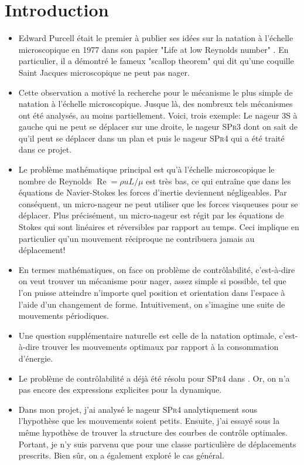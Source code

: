 \documentclass[12pt,a4paper]{article}
\theoremstyle{plain}
\theoremstyle{plain}
\theoremstyle{plain}
\theoremstyle{definition}
\theoremstyle{definition}
\theoremstyle{definition}
\theoremstyle{plain}
\DeclareMathOperator{\re}{Re}
\begin{document}
\section{Introduction}
\begin{itemize}
\item Edward Purcell était le premier à publier ses idées sur la natation à l'échelle microscopique en 1977 dans son papier "Life at low Reynolds number" \cite{Purcell1977}. En particulier, il a démontré le fameux "scallop theorem" qui dit qu'une coquille Saint Jacques microscopique ne peut pas nager.

\item Cette observation a motivé la recherche pour le mécanisme le plus simple de natation à l'échelle microscopique. Jusque là, des nombreux tels mécanismes ont été analysés, au moins partiellement. Voici, trois exemple: Le nageur \textsc{3S} à gauche qui ne peut se déplacer sur une droite, le nageur \textsc{SPr3} dont on sait de \cite{Alouges2017} qu'il peut se déplacer dans un plan et puis le nageur \textsc{SPr4} qui a été traité dans ce projet.

\item Le problème mathématique principal est qu'à l'échelle microscopique le nombre de Reynolds $\re = \rho u L/\mu$ est très bas, ce qui entraîne que dans les équations de Navier-Stokes les forces d'inertie deviennent négligeables. Par conséquent, un micro-nageur ne peut utiliser que les forces visqueuses pour se déplacer. Plus précisément, un micro-nageur est régit par les équations de Stokes qui sont linéaires et réversibles par rapport au temps. Ceci implique en particulier qu'un mouvement réciproque ne contribuera jamais au déplacement!

\item En termes mathématiques, on face on problème de contrôlabilité, c'est-à-dire on veut trouver un mécanisme pour nager, assez simple si possible, tel que l'on puisse atteindre n'importe quel position et orientation dans l'espace à l'aide d'un changement de forme. Intuitivement, on s'imagine une suite de mouvements périodiques.

\item Une question supplémentaire naturelle est celle de la natation optimale, c'est-à-dire trouver les mouvements optimaux par rapport à la consommation d'énergie.

\item Le problème de contrôlabilité a déjà été résolu pour \textsc{SPr4} dans \cite{Alouges2013}. Or, on n'a pas encore des expressions explicites pour la dynamique.

\item Dans mon projet, j'ai analysé le nageur \textsc{SPr4} analytiquement sous l'hypothèse que les mouvements soient petits. Ensuite, j'ai essayé sous la même hypothèse de trouver la structure des courbes de contrôle optimales. Portant, je n'y suis parvenu que pour une classe particulière de déplacements prescrits. Bien sûr, on a également exploré le cas général.
\end{itemize}
\end{document}
